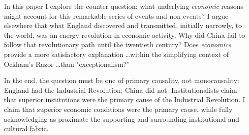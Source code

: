 \documentclass[12pt]{article}
\numberwithin{equation}{section}
\begin{document}
	In this paper I explore the counter question: what underlying \textit{economic} reasons might account for this remarkable series of events and non-events? I argue elsewhere that what England discovered and transmitted, initially  narrowly, to the world, was an energy revolution in economic activity. Why did China fail to follow that revolutionary path until the twentieth century? Does \textit{economics} provide a more satisfactory explanation \ldots within the simplifying context of Ockham's Razor \ldots than "exceptionalism?"
	
	In the end, the question must be one of primary causality, not monocausality: England had the Industrial Revolution; China did not. Institutionalists claim that superior institutions were the primary cause of the Industrial Revolution. I claim that superior economic conditions were the primary cause, while fully acknowledging as proximate the supporting and surrounding institutional and cultural fabric.	
	
\end{document}
